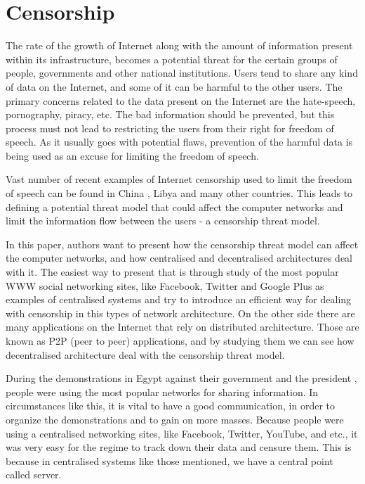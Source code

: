 \section{Censorship}
The rate of the growth of Internet along with the amount of information present within its infrastructure, becomes a potential threat for the certain groups of people, governments and other national institutions.
Users tend to share any kind of data on the Internet, and some of it can be harmful to the other users.
The primary concerns related to the data present on the Internet are the hate-speech, pornography, piracy, etc.
The bad information should be prevented, but this process must not lead to restricting the users from their right for freedom of speech.
As it usually goes with potential flaws, prevention of the harmful data is being used as an excuse for limiting the freedom of speech. 

Vast number of recent examples of Internet censorship used to limit the freedom of speech can be found in China \cite{canaves}, Libya \cite{dianotti2011} and many other countries. 
This leads to defining a potential threat model that could affect the computer networks and limit the information flow between the users - a censorship threat model.

In this paper, authors want to present how the censorship threat model can affect the computer networks, and how centralised and decentralised architectures deal with it.
The easiest way to present that is through study of the most popular WWW social networking sites, like Facebook, Twitter and Google Plus as examples of centralised systems and try to introduce an efficient way for dealing with censorship in this types of network architecture.
On the other side there are many applications on the Internet that rely on distributed architecture.
Those are known as P2P (peer to peer) applications, and by studying them we can see how decentralised architecture deal with the censorship threat model.

During the demonstrations in Egypt against their government and the president \cite{web:scialnetworkcriticalmass}, people were using the most popular networks for sharing information.
In circumstances like this, it is vital to have a good communication, in order to organize the demonstrations and to gain on more masses. 
Because people were using a centralised networking sites, like Facebook, Twitter, YouTube, and etc., it was very easy for the regime to track down their data and censure them.
This is because in centralised systems like those mentioned, we have a central point called server. 

